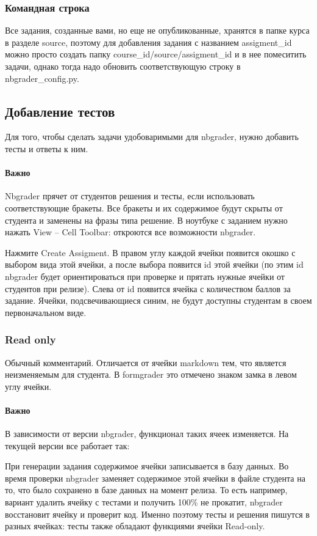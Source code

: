 \documentclass[a4paper,12pt]{article}
\begin{document}
\subsubsection{Командная строка}

Все задания, созданные вами, но еще не опубликованные, хранятся в папке курса в разделе source, поэтому для добавления задания с названием assigment\_id можно просто создать папку course\_id/source/assigment\_id и в нее помеситить задачи, однако тогда надо обновить соответствующую строку в nbgrader\_config.py.
\subsection{Добавление тестов}

Для того, чтобы сделать задачи удобоваримыми для nbgrader, нужно добавить тесты и ответы к ним.
\paragraph{Важно}Nbgrader прячет от студентов решения и тесты, если использовать соответствующие бракеты. Все бракеты и их содержимое будут скрыты от студента и заменены на фразы типа   решение\grqq.
В ноутбуке с заданием нужно нажать View -- Cell Toolbar: откроются все возможности nbgrader.

Нажмите Create Assigment. В правом углу каждой ячейки появится окошко с выбором вида этой ячейки, а после выбора появится id этой ячейки (по этим id nbgrader будет ориентироваться при проверке и прятать нужные ячейки от студентов при релизе). Слева от id появится ячейка с количеством баллов за задание. Ячейки, подсвечивающиеся синим, не будут доступны студентам в своем первоначальном виде.

\subsubsection{Read only}

Обычный комментарий. Отличается от ячейки markdown тем, что является неизменяемым для студента. В formgrader это отмечено знаком замка в левом углу ячейки.
\paragraph{Важно}
В зависимости от версии nbgrader, функционал таких ячеек изменяется. На текущей версии все работает так:

При генерации задания содержимое ячейки записывается в базу данных. Во время проверки nbgrader заменяет содержимое этой ячейки в файле студента на то, что было сохранено в базе данных на момент релиза. То есть например, вариант удалить ячейку с тестами и получить 100\% не прокатит, nbgrader восстановит ячейку и проверит код. Именно поэтому тесты и решения пишутся в разных ячейках: тесты также обладают функциями ячейки Read-only. 
\end{document}
